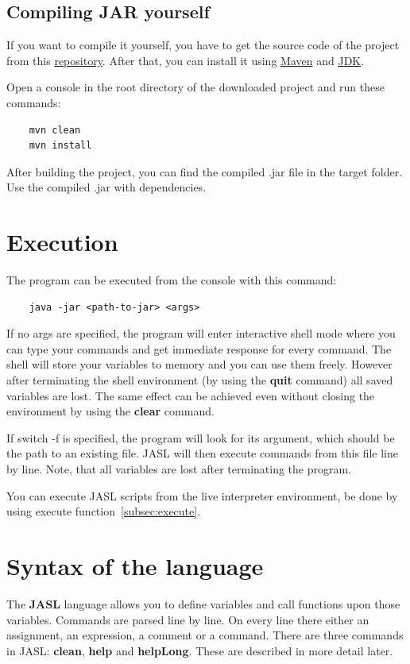 \documentclass{ctuthesis}
\begin{document}
\subsection{Compiling JAR yourself}
If you want to compile it yourself, you have to get the source code of the project from this \href{https://github.com/horovtom/jautomata}{repository}. After that, you can install it using \href{https://maven.apache.org/}{Maven} and \href{https://www.oracle.com/technetwork/java/javase/downloads/jdk8-downloads-2133151.html}{JDK}. 

Open a console in the root directory of the downloaded project and run these commands:
\begin{verbatim}
	mvn clean
	mvn install
\end{verbatim}

After building the project, you can find the compiled .jar file in the target folder. Use the compiled .jar with dependencies.

\section{Execution}
\label{sec:execution}
The program can be executed from the console with this command:

\begin{verbatim}
	java -jar <path-to-jar> <args>
\end{verbatim}

If no args are specified, the program will enter interactive shell mode where you can type your commands and get immediate response for every command. The shell will store your variables to memory and you can use them freely. However after terminating the shell environment (by using the \textbf{quit} command) all saved variables are lost. The same effect can be achieved even without closing the environment by using the \textbf{clear} command. 

If switch -f is specified, the program will look for its argument, which should be the path to an existing file. JASL will then execute commands from this file line by line. Note, that all variables are lost after terminating the program. 

You can execute JASL scripts from the live interpreter environment, be done by using execute function~\ref{subsec:execute}. 

\section{Syntax of the language}
\label{subsec:syntax}
The \textbf{JASL} language allows you to define variables and call functions upon those variables. Commands are parsed line by line. On every line there either an assignment, an expression, a comment or a command. There are three commands in JASL: \textbf{clean}, \textbf{help} and \textbf{helpLong}. These are described in more detail later.
\end{document}
